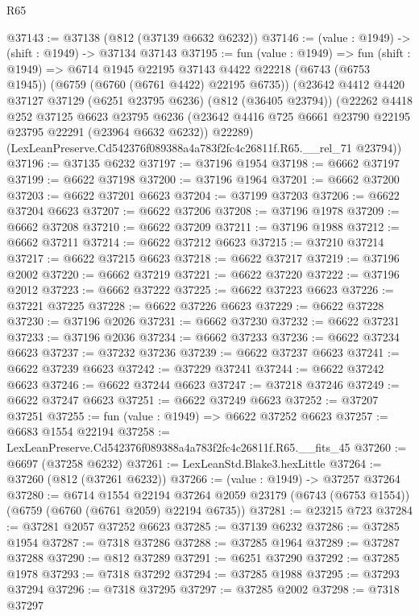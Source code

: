\begin{lexlean}{R65}
\begin{coremodule}
{@37143 := @37138 (@812 (@37139 @6632 @6232))
@37146 := (value : @1949) -> (shift : @1949) -> @37134 @37143
@37195 := fun (value : @1949) =>
  fun (shift : @1949) =>
  @6714
    @1945
    @22195
    @37143
    @4422
    @22218
    (@6743 (@6753 @1945))
    (@6759 (@6760 (@6761 @4422) @22195 @6735))
    (@23642
      @4412
      @4420
      @37127
      @37129
      (@6251 @23795 @6236)
      (@812 (@36405 @23794))
      (@22262
        @4418
        @252
        @37125
        @6623
        @23795
        @6236
        (@23642 @4416 @725 @6661 @23790 @22195 @23795 @22291 (@23964 @6632 @6232))
        @22289)
      (LexLeanPreserve.Cd542376f089388a4a783f2fc4c26811f.R65.__rel_71 @23794))
@37196 := @37135 @6232
@37197 := @37196 @1954
@37198 := @6662 @37197
@37199 := @6622 @37198
@37200 := @37196 @1964
@37201 := @6662 @37200
@37203 := @6622 @37201 @6623
@37204 := @37199 @37203
@37206 := @6622 @37204 @6623
@37207 := @6622 @37206
@37208 := @37196 @1978
@37209 := @6662 @37208
@37210 := @6622 @37209
@37211 := @37196 @1988
@37212 := @6662 @37211
@37214 := @6622 @37212 @6623
@37215 := @37210 @37214
@37217 := @6622 @37215 @6623
@37218 := @6622 @37217
@37219 := @37196 @2002
@37220 := @6662 @37219
@37221 := @6622 @37220
@37222 := @37196 @2012
@37223 := @6662 @37222
@37225 := @6622 @37223 @6623
@37226 := @37221 @37225
@37228 := @6622 @37226 @6623
@37229 := @6622 @37228
@37230 := @37196 @2026
@37231 := @6662 @37230
@37232 := @6622 @37231
@37233 := @37196 @2036
@37234 := @6662 @37233
@37236 := @6622 @37234 @6623
@37237 := @37232 @37236
@37239 := @6622 @37237 @6623
@37241 := @6622 @37239 @6623
@37242 := @37229 @37241
@37244 := @6622 @37242 @6623
@37246 := @6622 @37244 @6623
@37247 := @37218 @37246
@37249 := @6622 @37247 @6623
@37251 := @6622 @37249 @6623
@37252 := @37207 @37251
@37255 := fun (value : @1949) => @6622 @37252 @6623
@37257 := @6683 @1554 @22194
@37258 := LexLeanPreserve.Cd542376f089388a4a783f2fc4c26811f.R65.__fits_45
@37260 := @6697 (@37258 @6232)
@37261 := LexLeanStd.Blake3.hexLittle
@37264 := @37260 (@812 (@37261 @6232))
@37266 := (value : @1949) -> @37257 @37264
@37280 := @6714
    @1554
    @22194
    @37264
    @2059
    @23179
    (@6743 (@6753 @1554))
    (@6759 (@6760 (@6761 @2059) @22194 @6735))
@37281 := @23215 @723
@37284 := @37281 @2057 @37252 @6623
@37285 := @37139 @6232
@37286 := @37285 @1954
@37287 := @7318 @37286
@37288 := @37285 @1964
@37289 := @37287 @37288
@37290 := @812 @37289
@37291 := @6251 @37290
@37292 := @37285 @1978
@37293 := @7318 @37292
@37294 := @37285 @1988
@37295 := @37293 @37294
@37296 := @7318 @37295
@37297 := @37285 @2002
@37298 := @7318 @37297
}
\end{coremodule}
\end{lexlean}
